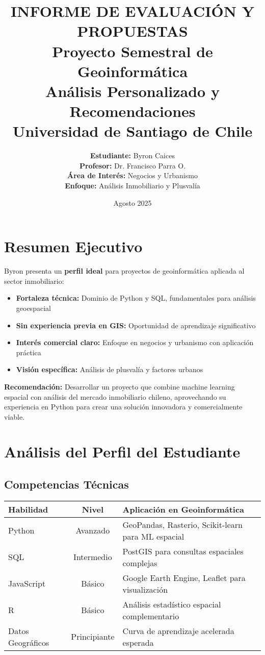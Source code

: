 \documentclass[12pt,a4paper]{article}
\title{
    \Large{\textbf{INFORME DE EVALUACIÓN Y PROPUESTAS}}\\
    \vspace{0.5cm}
    \huge{\textbf{Proyecto Semestral de Geoinformática}}\\
    \vspace{0.5cm}
    \large{Análisis Personalizado y Recomendaciones}\\
    \large{Universidad de Santiago de Chile}
}
\author{
    \textbf{Estudiante:} Byron Caices\\
    \textbf{Profesor:} Dr. Francisco Parra O.\\
    \textbf{Área de Interés:} Negocios y Urbanismo\\
    \textbf{Enfoque:} Análisis Inmobiliario y Plusvalía
}
\date{Agosto 2025}
\begin{document}
\maketitle
\thispagestyle{empty}
\newpage

\tableofcontents
\newpage

\section{Resumen Ejecutivo}

\begin{tcolorbox}[colback=blue!5!white,colframe=usachblue,title=\textbf{ANÁLISIS DEL PERFIL}]
Byron presenta un \textbf{perfil ideal} para proyectos de geoinformática aplicada al sector inmobiliario:

\begin{itemize}
    \item \textbf{Fortaleza técnica:} Dominio de Python y SQL, fundamentales para análisis geoespacial
    \item \textbf{Sin experiencia previa en GIS:} Oportunidad de aprendizaje significativo
    \item \textbf{Interés comercial claro:} Enfoque en negocios y urbanismo con aplicación práctica
    \item \textbf{Visión específica:} Análisis de plusvalía y factores urbanos
\end{itemize}

\textbf{Recomendación:} Desarrollar un proyecto que combine machine learning espacial con análisis del mercado inmobiliario chileno, aprovechando su experiencia en Python para crear una solución innovadora y comercialmente viable.
\end{tcolorbox}

\section{Análisis del Perfil del Estudiante}

\subsection{Competencias Técnicas}

\begin{center}
\begin{tabular}{|l|c|l|}
\hline
\textbf{Habilidad} & \textbf{Nivel} & \textbf{Aplicación en Geoinformática} \\
\hline
Python & Avanzado & GeoPandas, Rasterio, Scikit-learn para ML espacial \\
SQL & Intermedio & PostGIS para consultas espaciales complejas \\
JavaScript & Básico & Google Earth Engine, Leaflet para visualización \\
R & Básico & Análisis estadístico espacial complementario \\
Datos Geográficos & Principiante & Curva de aprendizaje acelerada esperada \\
\hline
\end{tabular}
\end{center}
\end{document}
